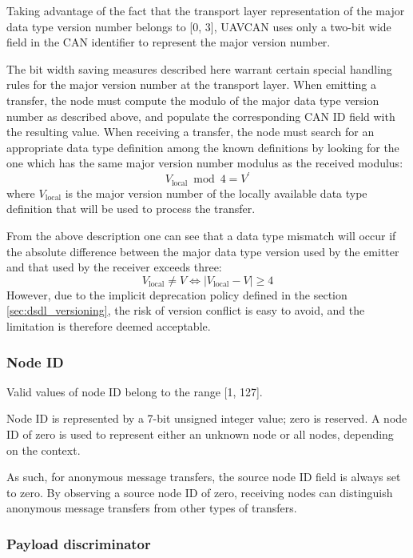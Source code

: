 Taking advantage of the fact that the transport layer representation of the major data type version number
belongs to [0, 3], UAVCAN uses only a two-bit wide field in the CAN identifier to represent the major
version number.

The bit width saving measures described here warrant certain special handling rules for the major version
number at the transport layer.
When emitting a transfer, the node must compute the modulo of the major data type version number
as described above, and populate the corresponding CAN ID field with the resulting value.
When receiving a transfer, the node must search for an appropriate data type definition
among the known definitions by looking for the one which has the same major version number modulus
as the received modulus:
$$V_\text{local} \bmod 4 = V^\prime{}$$
where $V_\text{local}$ is the major version number of the locally available data type definition that will be used
to process the transfer.

From the above description one can see that a data type mismatch will occur if the absolute difference between
the major data type version used by the emitter and that used by the receiver exceeds three:
$$V_\text{local} \neq V \Leftrightarrow{} \vert{}V_\text{local} - V\vert{} \geq 4$$
However, due to the implicit deprecation policy defined in the section \ref{sec:dsdl_versioning},
the risk of version conflict is easy to avoid, and the limitation is therefore deemed acceptable.

\subsubsection{Node ID}

Valid values of node ID belong to the range [1, 127].

Node ID is represented by a 7-bit unsigned integer value; zero is reserved.
A node ID of zero is used to represent either an unknown node or all nodes, depending on the context.

As such, for anonymous message transfers, the source node ID field is always set to zero.
By observing a source node ID of zero, receiving nodes can distinguish
anonymous message transfers from other types of transfers.

\subsubsection{Payload discriminator}\label{sec:can_payload_discriminator}


